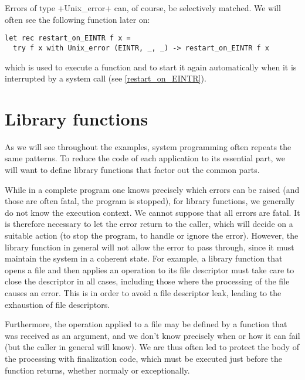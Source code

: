 Errors of type \ml+Unix_error+  can, of course, be
selectively matched. We will often see the following
function later on:
%
\begin{lstlisting}
let rec restart_on_EINTR f x = 
  try f x with Unix_error (EINTR, _, _) -> restart_on_EINTR f x 
\end{lstlisting}
%
which is used to execute a function and to start it again automatically
when it is interrupted by a system call (see \ref{restart_on_EINTR}).

\section{Library functions}

As we will see throughout the examples, system programming often
repeats the same patterns. To reduce the code of each application to
its essential part, we will want to define library functions that
factor out the common parts.

While in a complete program one knows precisely which errors can be
raised (and those are often fatal, the program is stopped), for
library functions, we generally do not know the execution context. We
cannot suppose that all errors are fatal. It is therefore necessary to
let the error return to the caller, which will decide on a suitable
action (to stop the program, to handle or ignore the error). However,
the library function in general will not allow the error to pass
through, since it must maintain the system in a coherent state. For
example, a library function that opens a file and then applies an
operation to its file descriptor must take care to close the
descriptor in all cases, including those where the processing of the
file causes an error. This is in order to avoid a file descriptor
leak, leading to the exhaustion of file descriptors.

Furthermore, the operation applied to a file may be defined by a
function that was received as an argument, and we don't know precisely
when or how it can fail (but the caller in general will know). We are
thus often led to protect the body of the processing with \quotes
{finalization} code, which must be executed just before the function
returns, whether normaly or exceptionally.

